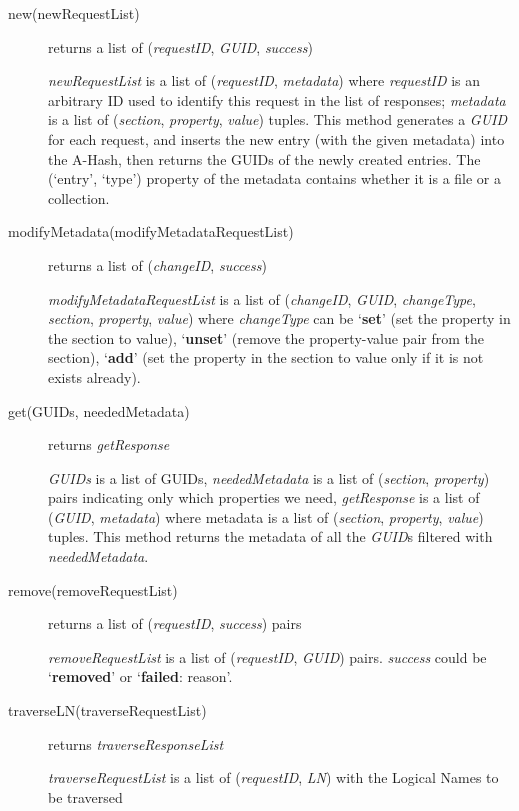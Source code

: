 \documentclass{book}
\begin{document}
 \begin{description}
    \item[new(newRequestList)] returns a list of (\emph{requestID}, \emph{GUID}, \emph{success})
    
    \emph{newRequestList} is a list of (\emph{requestID}, \emph{metadata}) where \emph{requestID} is an arbitrary ID used to identify this request in the list of responses; \emph{metadata} is a list of (\emph{section}, \emph{property}, \emph{value}) tuples.
    This method generates a \emph{GUID} for each request, and inserts the new entry (with the given metadata) into the A-Hash, then returns the GUIDs of the newly created entries. The (`entry', `type') property of the metadata contains whether it is a file or a collection.
    
    \item[modifyMetadata(modifyMetadataRequestList)] returns a list of (\emph{changeID}, \emph{success})

    \emph{modifyMetadataRequestList} is a list of (\emph{changeID}, \emph{GUID}, \emph{changeType}, \emph{section}, \emph{property}, \emph{value}) where \emph{changeType} can be `\textbf{set}' (set the property in the section to value), `\textbf{unset}' (remove the property-value pair from the section), `\textbf{add}' (set the property in the section to value only if it is not exists already).
    
    \item [get(GUIDs, neededMetadata)] returns \emph{getResponse}
    
    \emph{GUIDs} is a list of GUIDs, \emph{neededMetadata} is a list of (\emph{section}, \emph{property}) pairs indicating only which properties we need, \emph{getResponse} is a list of (\emph{GUID}, \emph{metadata}) where metadata is a list of (\emph{section}, \emph{property}, \emph{value}) tuples. This method returns the metadata of all the \emph{GUID}s filtered with \emph{neededMetadata}.
    
    \item [remove(removeRequestList)] returns a list of (\emph{requestID}, \emph{success}) pairs
    
    \emph{removeRequestList} is a list of (\emph{requestID}, \emph{GUID}) pairs. \emph{success} could be `\textbf{removed}' or `\textbf{failed}: reason'.
    
    \item [traverseLN(traverseRequestList)] returns \emph{traverseResponseList}
    
    \emph{traverseRequestList} is a list of (\emph{requestID}, \emph{LN}) with the Logical Names to be traversed
    

\end{description}
\end{document}
